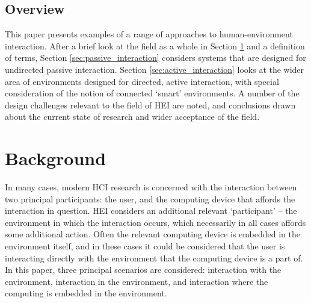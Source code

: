 \documentclass[oribibl,11pt]{llncs}
\begin{document}

\subsection{Overview}
This paper presents examples of a range of approaches to human-environment interaction. After a brief look at the field as a whole in Section \ref{sec:background} and a definition of terms, Section \ref{sec:passive_interaction} considers systems that are designed for undirected passive interaction. Section \ref{sec:active_interaction} looks at the wider area of environments designed for directed, active interaction, with special consideration of the notion of connected `smart' environments. A number of the design challenges relevant to the field of HEI are noted, and conclusions drawn about the current state of research and wider acceptance of the field.

\section{Background}		\label{sec:background}

In many cases, modern HCI research is concerned with the interaction between two principal participants: the user, and the computing device that affords the interaction in question. HEI considers an additional relevant `participant' -- the environment in which the interaction occurs, which necessarily in all cases affords some additional action. Often the relevant computing device is embedded in the environment itself, and in these cases it could be considered that the user is interacting directly with the environment that the computing device is a part of. In this paper, three principal scenarios are considered: interaction with the environment, interaction in the environment, and interaction where the computing is embedded in the environment.
\end{document}
